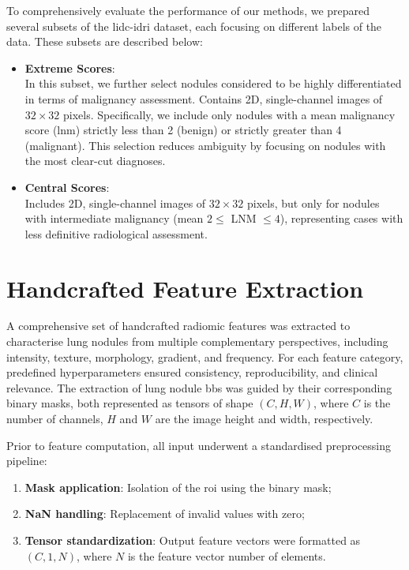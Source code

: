 To comprehensively evaluate the performance of our methods, we prepared several subsets of the \ac{lidc-idri} dataset, each focusing on different labels of the data. These subsets are described below:

        
\begin{itemize} 
    \item \textbf{Extreme Scores}:\\
    In this subset, we further select nodules considered to be highly differentiated in terms of malignancy assessment. Contains 2D, single-channel images of $32 \times 32$ pixels. Specifically, we include only nodules with a mean malignancy score (\ac{lnm}) strictly less than 2 (benign) or strictly greater than 4 (malignant). This selection reduces ambiguity by focusing on nodules with the most clear-cut diagnoses.
        
    \item \textbf{Central Scores}:\\
    Includes 2D, single-channel images of $32 \times 32$ pixels, but only for nodules with intermediate malignancy (mean $2 \leq$ LNM $\leq 4$), representing cases with less definitive radiological assessment.
\end{itemize}


\section{Handcrafted Feature Extraction}

A comprehensive set of handcrafted radiomic features was extracted to characterise lung nodules from multiple complementary perspectives, including intensity, texture, morphology, gradient, and frequency. For each feature category, predefined hyperparameters ensured consistency, reproducibility, and clinical relevance. The extraction of lung nodule \acp{bb} was guided by their corresponding binary masks, both represented as tensors of shape $(C, H, W)$, where $C$ is the number of channels, $H$ and $W$ are the image height and width, respectively.

Prior to feature computation, all input underwent a standardised preprocessing pipeline:
\begin{enumerate}
    \item \textbf{Mask application}: Isolation of the \ac{roi} using the binary mask;
    \item \textbf{NaN handling}: Replacement of invalid values with zero;
    \item \textbf{Tensor standardization}: Output feature vectors were formatted as $(C, 1, N)$, where $N$ is the feature vector number of elements.
\end{enumerate}

